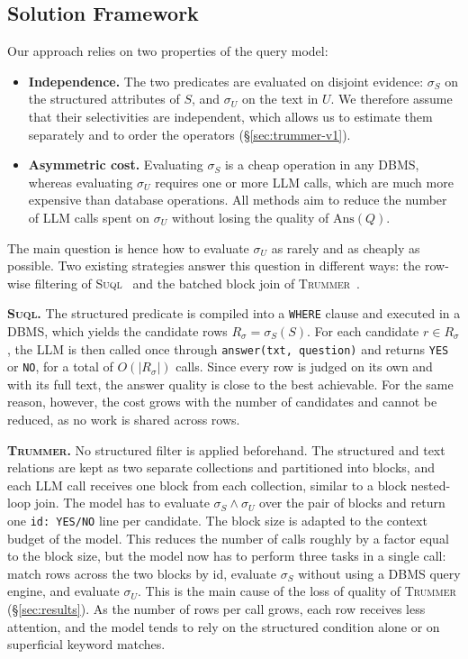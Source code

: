 \documentclass[sigconf]{acmart}
\begin{document}
\subsection{Solution Framework}
\label{sec:solution-framework}
 Our approach relies on two properties of the query model:
\begin{itemize}
    \item \textbf{Independence.} The two predicates are evaluated on disjoint evidence: $\sigma_S$ on the structured attributes of $S$, and $\sigma_U$ on the text in $U$. We therefore assume that their selectivities are independent, which allows us to estimate them separately and to order the operators (\S\ref{sec:trummer-v1}).
    \item \textbf{Asymmetric cost.} Evaluating $\sigma_S$ is a cheap operation in any DBMS, whereas evaluating $\sigma_U$ requires one or more LLM calls, which are much more expensive than database operations. All methods aim to reduce the number of LLM calls spent on $\sigma_U$ without losing the quality of $\mathrm{Ans}(Q)$.
\end{itemize}

The main question is hence how to evaluate $\sigma_U$ as rarely and as cheaply as possible. Two existing strategies answer this question in different ways: the row-wise filtering of \textsc{Suql}~\cite{liu2023suql} and the batched block join of \textsc{Trummer}~\cite{trummer2025semanticjoin}.

\textbf{\textsc{Suql}.} The structured predicate is compiled into a \texttt{WHERE} clause and executed in a DBMS, which yields the candidate rows $R_\sigma = \sigma_S(S)$. For each candidate $r \in R_\sigma$, the LLM is then called once through \texttt{answer(txt, question)} and returns \texttt{YES} or \texttt{NO}, for a total of $O(|R_\sigma|)$ calls. Since every row is judged on its own and with its full text, the answer quality is close to the best achievable. For the same reason, however, the cost grows with the number of candidates and cannot be reduced, as no work is shared across rows.

\textbf{\textsc{Trummer}.} No structured filter is applied beforehand. The structured and text relations are kept as two separate collections and partitioned into blocks, and each LLM call receives one block from each collection, similar to a block nested-loop join. The model has to evaluate $\sigma_S \wedge \sigma_U$ over the pair of blocks and return one \texttt{id: YES/NO} line per candidate. The block size is adapted to the context budget of the model. This reduces the number of calls roughly by a factor equal to the block size, but the model now has to perform three tasks in a single call: match rows across the two blocks by id, evaluate $\sigma_S$ without using a DBMS query engine, and evaluate $\sigma_U$. This is the main cause of the loss of quality of \textsc{Trummer} (\S\ref{sec:results}). As the number of rows per call grows, each row receives less attention, and the model tends to rely on the structured condition alone or on superficial keyword matches.
\end{document}
